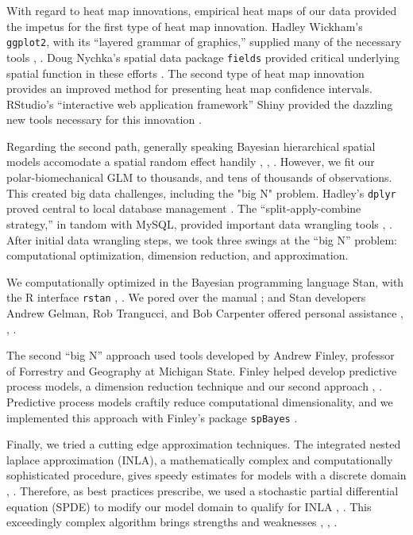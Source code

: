 With regard to heat map innovations, empirical heat maps of our data provided the impetus for the first type of heat map innovation. Hadley Wickham's \verb|ggplot2|, with its ``layered grammar of graphics,'' supplied many of the necessary tools \citep{Wickham2009}, \citep{Wickham2010}. Doug Nychka's spatial data package \verb|fields| provided critical underlying spatial function in these efforts \citep{Nychka}. The second type of heat map innovation provides an improved method for presenting heat map confidence intervals. RStudio's ``interactive web application framework'' Shiny provided the dazzling new tools necessary for this innovation \citep{Shiny}.

Regarding the second path, generally speaking Bayesian hierarchical spatial models accomodate a spatial random effect handily \citep{Gelman2014}, \citep{Banerjee2014}, \citep{Oliver2005}. However, we fit our polar-biomechanical GLM to thousands, and tens of thousands of observations. This created big data challenges, including the "big N" problem. Hadley's \verb|dplyr| proved central to local database management \citep{Wickham2016}. The ``split-apply-combine strategy,'' in tandom with MySQL, provided important data wrangling tools \citep{Wickham2016}, \citep{Tahaghoghi2006}. After initial data wrangling steps, we took three swings at the ``big N'' problem: computational optimization, dimension reduction, and approximation.

We computationally optimized in the Bayesian programming language Stan, with the R interface \verb|rstan| \citep{rstan}, \citep{Gelman2015}. We pored over the manual \citep{STANtheMan}; and Stan developers Andrew Gelman, Rob Trangucci, and Bob Carpenter offered personal assistance \citep{Gelman}, \citep{Trangucci}, \citep{Carpenter}.

The second ``big N'' approach used tools developed by Andrew Finley, professor of Forrestry and Geography at Michigan State. Finley helped develop predictive process models, a dimension reduction technique and our second approach \citep{Banerjee2008}, \citep{Finley2012}. Predictive process models craftily reduce computational dimensionality, and we implemented this approach with Finley's package \verb|spBayes| \citep{Finley2013}.

Finally, we tried a cutting edge approximation techniques. The integrated nested laplace approximation (INLA), a mathematically complex and computationally sophisticated procedure, gives speedy estimates for models with a discrete domain \citep{Rue2009}, \citep{Rue2005}. Therefore, as best practices prescribe, we used a stochastic partial differential equation (SPDE) to modify our model domain to qualify for INLA \citep{Lindgren2011}, \citep{Lindstrom2016}. This exceedingly complex algorithm brings strengths and weaknesses \citep{Mondal2017}, \citep{Simpson2012b}, \citep{Rue2009}.

